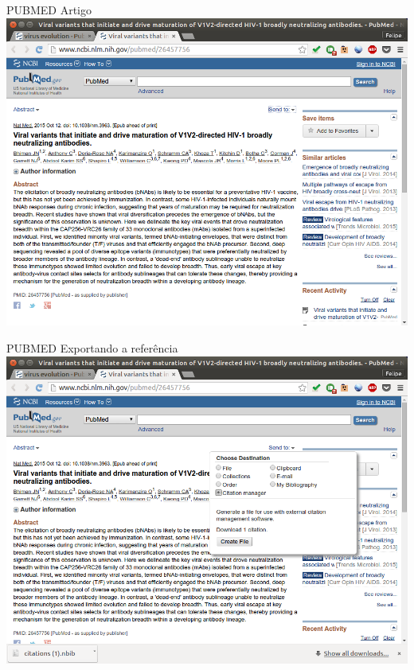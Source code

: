 \documentclass{beamer}
\begin{document}
\begin{frame}{PUBMED Artigo}
  \includegraphics[height=.85\textheight]{Busca/pubmed-paper}
\end{frame}

\begin{frame}{PUBMED Exportando a referência}
  \includegraphics[height=.85\textheight]{Busca/pubmed-export1}
\end{frame}
\end{document}
